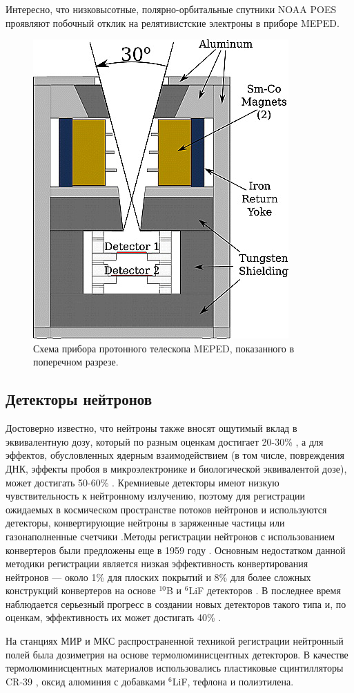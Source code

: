 Интересно, что низковысотные, полярно-орбитальные спутники NOAA POES проявляют побочный отклик на релятивистские электроны в приборе MEPED\cite{Yando2011}.
\begin{figure}
	\centering
	\includegraphics[width=0.3\linewidth]{images/jgra21383-fig-0002}
	\caption{Схема прибора протонного телескопа MEPED, показанного в поперечном разрезе.\cite{Yando2011}}
	\label{fig:jgra21383-fig-0002}
\end{figure}


\subsection{Детекторы нейтронов} \label{subsect1_3_1}


Достоверно известно, что нейтроны также вносят ощутимый вклад в эквивалентную дозу, который по разным оценкам достигает 20-30\% \cite{Dudkin1990}, а для эффектов, обусловленных ядерным взаимодействием (в том числе, повреждения ДНК, эффекты пробоя в микроэлектронике и биологической эквивалентой дозе), может достигать 50-60\% \cite{Armstrong2001} \cite{Benton2001}. Кремниевые детекторы имеют низкую чувствительность к нейтронному излучению, поэтому для регистрации ожидаемых в космическом пространстве потоков нейтронов \cite{Esteban2016} и используются детекторы, конвертирующие нейтроны в заряженные частицы или газонаполненные счетчики \cite{Stozhkov2007}.Методы регистрации нейтронов с использованием конвертеров были предложены еще в 1959 году \cite{McGregor2013}. Основным недостатком данной методики регистрации является низкая эффективность конвертирования нейтронов --- около 1\% для плоских покрытий и 8\% для более сложных конструкций конвертеров на основе $ ^{10} $B и $ ^6 $LiF детекторов \cite{Mendicino2015}. В последнее время наблюдается серьезный прогресс в создании новых детекторов такого типа и, по оценкам, эффективность их может достигать 40\% \cite{McGregor2013}. 

На станциях МИР и МКС распространенной техникой регистрации нейтронный полей была дозиметрия на основе термолюминисцентных детекторов. В качестве термолюминисцентных материалов использовались пластиковые сцинтилляторы CR-39 \cite{Alberts1991}, оксид алюминия с добавками $ ^6 $LiF, тефлона и полиэтилена\cite{Kulkarni2011}.

